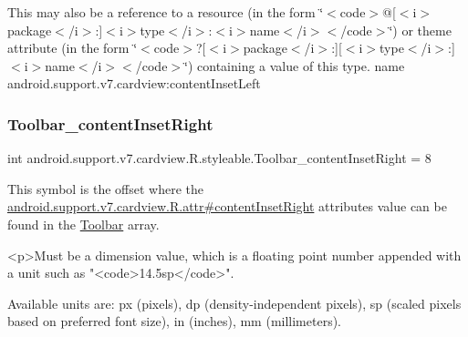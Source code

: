 This may also be a reference to a resource (in the form \char`\"{}$<$code$>$@\mbox{[}$<$i$>$package$<$/i$>$\+:\mbox{]}$<$i$>$type$<$/i$>$\+:$<$i$>$name$<$/i$>$$<$/code$>$\char`\"{}) or theme attribute (in the form \char`\"{}$<$code$>$?\mbox{[}$<$i$>$package$<$/i$>$\+:\mbox{]}\mbox{[}$<$i$>$type$<$/i$>$\+:\mbox{]}$<$i$>$name$<$/i$>$$<$/code$>$\char`\"{}) containing a value of this type.  name android.\+support.\+v7.\+cardview\+:content\+Inset\+Left \mbox{\label{classandroid_1_1support_1_1v7_1_1cardview_1_1R_1_1styleable_a9029bc8fbf941277cd67da6b7fd92668}} 
\subsubsection{\texorpdfstring{Toolbar\+\_\+content\+Inset\+Right}{Toolbar\_contentInsetRight}}
{\footnotesize\ttfamily int android.\+support.\+v7.\+cardview.\+R.\+styleable.\+Toolbar\+\_\+content\+Inset\+Right = 8\hspace{0.3cm}{\ttfamily [static]}}

This symbol is the offset where the \hyperlink{classandroid_1_1support_1_1v7_1_1cardview_1_1R_1_1attr_a521bca396b0fb2722f7dda4656f2d45c}{android.\+support.\+v7.\+cardview.\+R.\+attr\#content\+Inset\+Right} attribute\textquotesingle{}s value can be found in the \hyperlink{classandroid_1_1support_1_1v7_1_1cardview_1_1R_1_1styleable_a26149aeb8fd339abe09ecc9d92b9304f}{Toolbar} array.

\begin{DoxyVerb}      <p>Must be a dimension value, which is a floating point number appended with a unit such as "<code>14.5sp</code>".
\end{DoxyVerb}
 Available units are\+: px (pixels), dp (density-\/independent pixels), sp (scaled pixels based on preferred font size), in (inches), mm (millimeters). 

